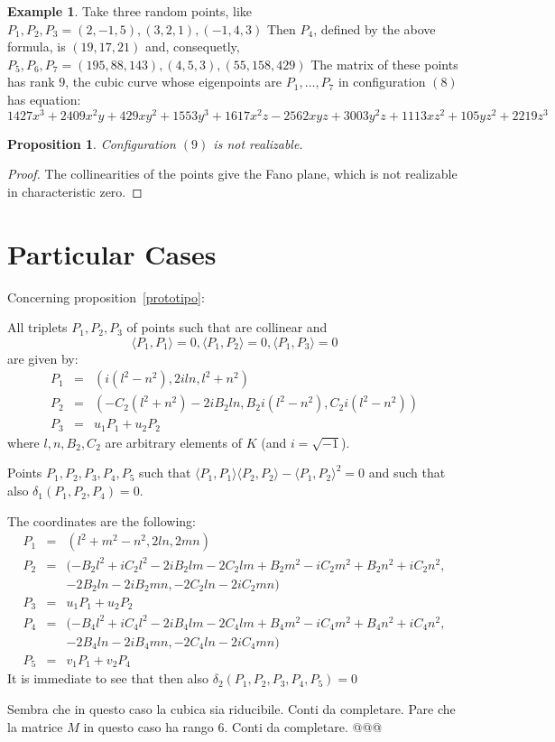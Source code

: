 \documentclass{amsart}
\theoremstyle{plain}
\newtheorem{prop}[theorem]{Proposition}
\theoremstyle{definition}
\newtheorem{example}[theorem]{Example}
\newcommand{\scl}[2]{\langle #1, #2 \rangle}
\begin{document}
\begin{example}
  Take three random points, like
  $P_1, P_2, P_3 = (2, -1, 5), (3, 2, 1), (-1, 4, 3)$
  Then $P_4$, defined by the above formula, is $(19, 17, 21)$
  and, consequetly, $P_5, P_6, P_7 = (195, 88, 143), (4, 5, 3), (55, 158, 429)$
  The matrix of these points has rank $9$, the cubic curve whose
  eigenpoints are $P_1, \dots, P_7$ in configuration $(8)$ has equation:
  \[
1427x^3 + 2409x^2y + 429xy^2 + 1553y^3 + 1617x^2z - 2562xyz + 3003y^2z + 1113xz^2 + 105yz^2 + 2219z^3
  \]
\end{example}
\begin{prop} Configuration $(9)$ is not realizable.
\end{prop}
\begin{proof}
  The collinearities of the points give the Fano plane, which is not
  realizable in characteristic zero.
\end{proof}

\section{Particular Cases}
Concerning proposition~\ref{prototipo}:

All triplets $P_1, P_2, P_3$ of points such that are collinear and
\[\scl{P_1}{P_1} = 0, \scl{P_1}{P_2} = 0, \scl{P_1}{P_3} = 0
\]
are given by:
\begin{eqnarray*}
P_1 &=& (i(l^2-n^2), 2iln, l^2+n^2) \\
P_2 &=& (-C_2(l^2+n^2) - 2iB_2ln, B_2i(l^2-n^2), C_2i(l^2-n^2))\\
P_3 &=& u_1P_1+u_2P_2
\end{eqnarray*}
where $l, n, B_2, C_2$ are arbitrary elements of $K$ (and $i=\sqrt{-1}$).

\bigskip
Points $P_1, P_2, P_3, P_4, P_5$ such that 
$\scl{P_1}{P_1}\scl{P_2}{P_2}-\scl{P_1}{P_2}^2 = 0$ and such that also
$\delta_1(P_1, P_2, P_4)=0$.

The coordinates are the following:
\begin{eqnarray*}
  P_1 &=& (l^2+m^2-n^2, 2ln, 2mn)\\
  P_2 &=& (-B_2l^2 + iC_2l^2 -2iB_2lm-2C_2lm + B_2m^2-iC_2m^2 + B_2n^2 + iC_2n^2,\\
  & & -2B_2ln -2iB_2mn, -2C_2ln -2iC_2mn)\\
  P_3 &=& u_1P_1+u_2P_2\\
  P_4 &=& (-B_4l^2 + iC_4l^2 -2iB_4lm-2C_4lm + B_4m^2 -iC_4m^2+B_4n^2 + iC_4n^2,\\
  & & -2B_4ln -2iB_4mn, -2C_4ln -2iC_4mn)\\
  P_5 &=& v_1P_1+v_2P_4
\end{eqnarray*}
It is immediate to see that then also $\delta_2(P_1, P_2, P_3, P_4, P_5) = 0$

Sembra che in questo caso la cubica sia riducibile. Conti da completare.
Pare che la matrice $M$ in questo caso ha rango $6$. Conti da completare.
@@@
\end{document}
